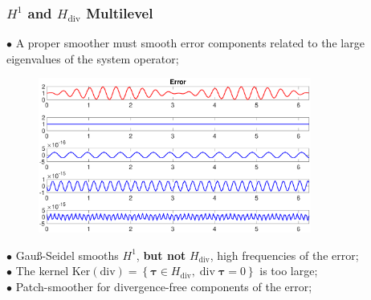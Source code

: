 \documentclass[8pt, oneside]{beamer}   	%
\newcommand{\tdiv}{\operatorname{div}}
\newcommand{\btau}{\boldsymbol{\tau}}
\newcommand{\titlecolor}[1]{\frametitle{\textcolor{dkgrey}{ \textbf{#1}}}}
\begin{document}
\begin{frame}
\titlecolor{$H^1$ and $H_{\text{div}}$ Multilevel}
\footnotesize
 $\bullet$ A proper smoother must smooth error components related to the large eigenvalues of the system operator; 
 \begin{figure}[htbp!]
	\includegraphics[width=0.8\textwidth]{img/errorfrequencydecomposition.eps}
		\label{abb_arc}
\end{figure}
 $\bullet$ Gau{\ss}-Seidel smooths $H^1$, \textbf{but not} $H_{\text{div}}$,  high frequencies of the error;\\
$\bullet$ The kernel $\text{Ker}(\text{div})=  \left\lbrace \btau \in H_{\text{div}}, \tdiv \btau =0   \right\rbrace $ is too large;\\
$\bullet$ Patch-smoother for divergence-free components of the error;
\end{frame}



\end{document}
